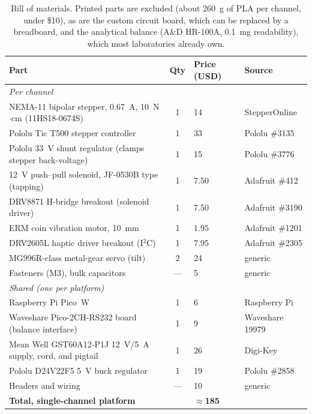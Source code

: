 \documentclass[10pt]{article}
\begin{document}
\begin{table}[h]
\centering
\small
\caption{Bill of materials. Printed parts are excluded (about 260~g of PLA per
channel, under \$10), as are the custom circuit board, which can be replaced by a
breadboard, and the analytical balance (A\&D HR-100A, 0.1~mg readability),
which most laboratories already own.}
\label{tbl:bom}
\begin{tabular}{p{7.0cm}cp{1.4cm}p{4.0cm}}
\toprule
Part & Qty & Price (USD) & Source \\
\midrule
\multicolumn{4}{l}{\emph{Per channel}}\\
NEMA-11 bipolar stepper, 0.67~A, 10~N$\cdot$cm (11HS18-0674S) & 1 & 14 & StepperOnline \\
Pololu Tic T500 stepper controller & 1 & 33 & Pololu \#3135 \\
Pololu 33~V shunt regulator (clamps stepper back-voltage) & 1 & 15 & Pololu \#3776 \\
12~V push--pull solenoid, JF-0530B type (tapping) & 1 & 7.50 & Adafruit \#412 \\
DRV8871 H-bridge breakout (solenoid driver) & 1 & 7.50 & Adafruit \#3190 \\
ERM coin vibration motor, 10~mm & 1 & 1.95 & Adafruit \#1201 \\
DRV2605L haptic driver breakout (I$^2$C) & 1 & 7.95 & Adafruit \#2305 \\
MG996R-class metal-gear servo (tilt) & 2 & 24 & generic \\
Fasteners (M3), bulk capacitors & --- & 5 & generic \\
\midrule
\multicolumn{4}{l}{\emph{Shared (one per platform)}}\\
Raspberry Pi Pico~W & 1 & 6 & Raspberry Pi \\
Waveshare Pico-2CH-RS232 board (balance interface) & 1 & 9 & Waveshare 19979 \\
Mean Well GST60A12-P1J 12~V/5~A supply, cord, and pigtail & 1 & 26 & Digi-Key \\
Pololu D24V22F5 5~V buck regulator & 1 & 19 & Pololu \#2858 \\
Headers and wiring & --- & 10 & generic \\
\midrule
\multicolumn{2}{l}{\textbf{Total, single-channel platform}} & \textbf{$\approx$185} & \\
\bottomrule
\end{tabular}
\end{table}
\end{document}
